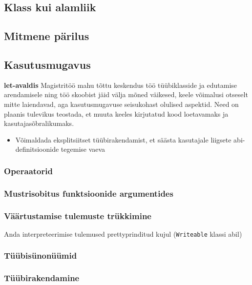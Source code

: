 \documentclass[12pt]{article}
\newcommand\markus[1]{\textcolor{roheline}{\textbf{#1}}}
\begin{document}
    \subsection{Klass kui alamliik}
      
    \subsection{Mitmene pärilus}
      
    \subsection{Kasutusmugavus}
      \markus{let-avaldis} Magistritöö mahu tõttu keskendus töö tüübiklasside ja edutamise arendamisele ning töö skoobist jäid välja mõned väikesed, keele võimalusi otseselt mitte laiendavad, aga kasutusmugavuse seisukohast olulised aspektid. Need on plaanis tulevikus teostada, et muuta keeles kirjutatud kood loetavamaks ja kasutajasõbralikumaks.
      \begin{itemize}
        \item
          Võimaldada eksplitsiitset tüübirakendamist, et säästa kasutajale liigsete abi-definitsioonide tegemise vaeva
      \end{itemize}
      \subsubsection{Operaatorid}
        
      \subsubsection{Mustrisobitus funktsioonide argumentides}
        
      \subsubsection{Väärtustamise tulemuste trükkimine}
        Anda interpreteerimise tulemused prettyprinditud kujul (\verb!Writeable! klassi abil)
      \subsubsection{Tüübisünonüümid}
        
      \subsubsection{Tüübirakendamine}
        
\end{document}
